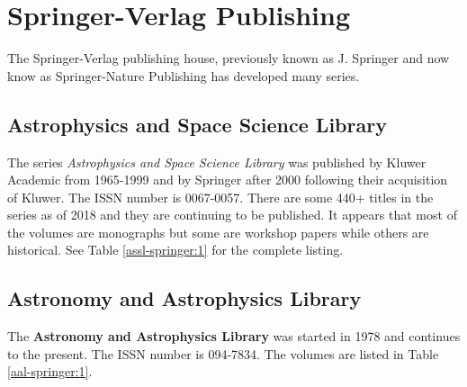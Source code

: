 \section{Springer-Verlag Publishing}

The Springer-Verlag publishing house, previously known as J. Springer
and now know as Springer-Nature Publishing has developed many series.

\subsection{Astrophysics and Space Science Library}

The series {\it Astrophysics and Space Science Library} was published
by Kluwer Academic from 1965-1999 and by Springer after 2000 following
their acquisition of Kluwer.  The ISSN number is 0067-0057. There are
some 440+ titles in the series as of 2018 and they are continuing to
be published.  It appears that most of the volumes are monographs but
some are workshop papers while others are historical. See Table
\ref{assl-springer:1} for the complete listing.

\subsection{Astronomy and Astrophysics Library}
  
The {\bf Astronomy and Astrophysics Library} was started in 1978 and
continues to the present. The ISSN number is 094-7834. The volumes are
listed in Table \ref{aal-springer:1}.
